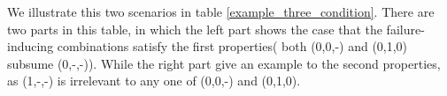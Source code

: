 \documentclass{sig-alternate}
\begin{document}
%
%
%


We illustrate this two scenarios in table \ref{example_three_condition}. There are two parts in this table, in which the left part shows the case that the failure-inducing combinations satisfy the first properties( both (0,0,-) and (0,1,0) subsume (0,-,-)). While the right part give an example to the second properties, as (1,-,-) is irrelevant to any one of (0,0,-) and (0,1,0).

%
\end{document}
